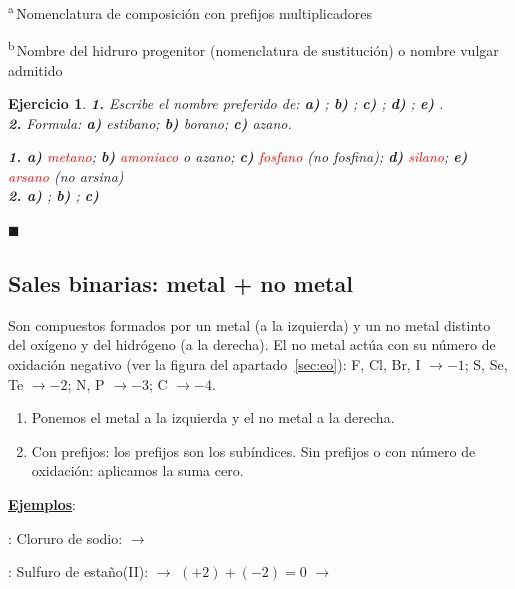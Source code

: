 \documentclass[12pt]{article}
\theoremstyle{mygreennumbox}
\newtheorem{ejercicioT}{Ejercicio}[section]
\newenvironment{exercise}{\begin{eBoxmygreen}\begin{ejercicioT}}{\hfill{\color{mygreen}\tiny\ensuremath{\blacksquare}}\end{ejercicioT}\end{eBoxmygreen}}
\newcommand{\formulan}{\vspace*{2mm}\noindent\xmybox{\bfseries ¿Cómo se formulan?}\par\smallskip}
\newcommand{\ejemplos}{\par\noindent\textbf{\uline{Ejemplos}}:\par}
\begin{document}
{\footnotesize
    \textsuperscript{a}\,Nomenclatura de composición con prefijos multiplicadores\par
    \textsuperscript{b}\,Nombre del hidruro progenitor (nomenclatura de sustitución) o nombre vulgar admitido\par
}

\begin{exercise}
    \textbf{1.} Escribe el nombre preferido de: \textbf{a)} ; \textbf{b)} ; \textbf{c)} ; \textbf{d)} ; \textbf{e)} .\\
    \textbf{2.} Formula: \textbf{a)} estibano; \textbf{b)} borano; \textbf{c)} azano.
    \begin{solu}
        \textbf{1. a)} \textcolor{red}{metano}; \textbf{b)} \textcolor{red}{amoniaco} o azano; \textbf{c)} \textcolor{red}{fosfano} (no fosfina); \textbf{d)} \textcolor{red}{silano}; \textbf{e)} \textcolor{red}{arsano} (no arsina)\\
        \textbf{2. a)} \textcolor{red}{}; \textbf{b)} \textcolor{red}{}; \textbf{c)} \textcolor{red}{}
    \end{solu}
\end{exercise}

\subsection{Sales binarias: metal + no metal}\label{sec:sales_binarias}

Son compuestos formados por un metal (a la izquierda) y un no metal distinto del oxígeno y del hidrógeno (a la derecha). El no metal actúa con su número de oxidación negativo (ver la figura del apartado~\ref{sec:eo}): F, Cl, Br, I \(\to -1\); S, Se, Te \(\to -2\); N, P \(\to -3\); C \(\to -4\).

\formulan
\begin{enumerate}[label=\itembolascolor{\arabic*}{green!40!black}]
    \item Ponemos el metal a la izquierda y el no metal a la derecha.
    \item Con prefijos: los prefijos son los subíndices.
    Sin prefijos o con número de oxidación: aplicamos la suma cero.
\end{enumerate}

\ejemplos
{} : Cloruro de sodio:   \(\to\) 

 : Sulfuro de estaño(II):   \(\to\) \((+2)+(-2)=0\) \(\to\) 
\end{document}
